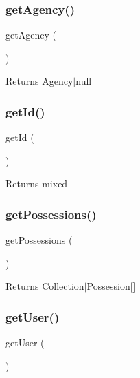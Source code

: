 \subsubsection{\texorpdfstring{getAgency()}{getAgency()}}
{\footnotesize\ttfamily get\+Agency (\begin{DoxyParamCaption}{ }\end{DoxyParamCaption})}

\begin{DoxyReturn}{Returns}
Agency$\vert$null 
\end{DoxyReturn}
\mbox{\label{class_app_1_1_entity_1_1_agent_a12251d0c022e9e21c137a105ff683f13}} 
\subsubsection{\texorpdfstring{getId()}{getId()}}
{\footnotesize\ttfamily get\+Id (\begin{DoxyParamCaption}{ }\end{DoxyParamCaption})}

\begin{DoxyReturn}{Returns}
mixed 
\end{DoxyReturn}
\mbox{\label{class_app_1_1_entity_1_1_agent_ac4cac51c734a24a84655cd6294ff4afb}} 
\subsubsection{\texorpdfstring{getPossessions()}{getPossessions()}}
{\footnotesize\ttfamily get\+Possessions (\begin{DoxyParamCaption}{ }\end{DoxyParamCaption})}

\begin{DoxyReturn}{Returns}
Collection$\vert$\+Possession\mbox{[}\mbox{]} 
\end{DoxyReturn}
\mbox{\label{class_app_1_1_entity_1_1_agent_ae81b7186fb97a7c6457edcc68c9aa2ef}} 
\subsubsection{\texorpdfstring{getUser()}{getUser()}}
{\footnotesize\ttfamily get\+User (\begin{DoxyParamCaption}{ }\end{DoxyParamCaption})}

